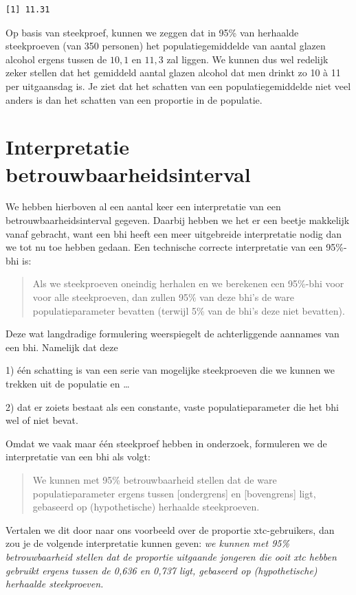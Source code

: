 \documentclass[
  letterpaper,
  DIV=11,
  numbers=noendperiod]{scrreprt}
\begin{document}
\begin{verbatim}
[1] 11.31
\end{verbatim}

Op basis van steekproef, kunnen we zeggen dat in 95\% van herhaalde
steekproeven (van 350 personen) het populatiegemiddelde van aantal
glazen alcohol ergens tussen de \(10,1\) en \(11,3\) zal liggen. We
kunnen dus wel redelijk zeker stellen dat het gemiddeld aantal glazen
alcohol dat men drinkt zo 10 à 11 per uitgaansdag is. Je ziet dat het
schatten van een populatiegemiddelde niet veel anders is dan het
schatten van een proportie in de populatie.

\section{Interpretatie
betrouwbaarheidsinterval}\label{sec-interpretatiebhi}

We hebben hierboven al een aantal keer een interpretatie van een
betrouwbaarheidsinterval gegeven. Daarbij hebben we het er een beetje
makkelijk vanaf gebracht, want een bhi heeft een meer uitgebreide
interpretatie nodig dan we tot nu toe hebben gedaan. Een technische
correcte interpretatie van een 95\%-bhi is:

\begin{quote}
Als we steekproeven oneindig herhalen en we berekenen een 95\%-bhi voor
voor alle steekproeven, dan zullen 95\% van deze bhi's de ware
populatieparameter bevatten (terwijl 5\% van de bhi's deze niet
bevatten).
\end{quote}

Deze wat langdradige formulering weerspiegelt de achterliggende aannames
van een bhi. Namelijk dat deze

1) één schatting is van een serie van mogelijke steekproeven die we
kunnen we trekken uit de populatie en \ldots{}

2) dat er zoiets bestaat als een constante, vaste populatieparameter die
het bhi wel of niet bevat.

Omdat we vaak maar één steekproef hebben in onderzoek, formuleren we de
interpretatie van een bhi als volgt:

\begin{quote}
We kunnen met 95\% betrouwbaarheid stellen dat de ware
populatieparameter ergens tussen {[}ondergrens{]} en {[}bovengrens{]}
ligt, gebaseerd op (hypothetische) herhaalde steekproeven.
\end{quote}

Vertalen we dit door naar ons voorbeeld over de proportie
xtc-gebruikers, dan zou je de volgende interpretatie kunnen geven:
\emph{we kunnen met 95\% betrouwbaarheid stellen dat de proportie
uitgaande jongeren die ooit xtc hebben gebruikt ergens tussen de 0,636
en 0,737 ligt, gebaseerd op (hypothetische) herhaalde steekproeven.}
\end{document}
